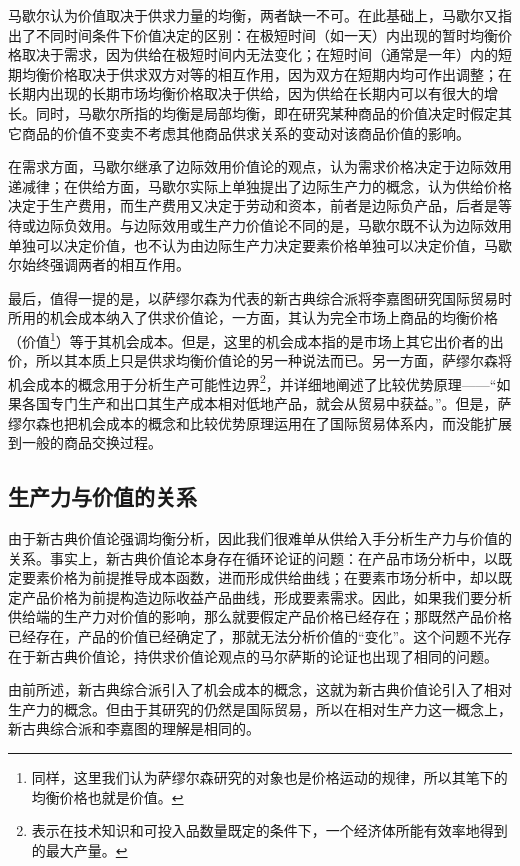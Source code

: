 马歇尔认为价值取决于供求力量的均衡，两者缺一不可。在此基础上，马歇尔又指出了不同时间条件下价值决定的区别：在极短时间（如一天）内出现的暂时均衡价格取决于需求，因为供给在极短时间内无法变化；在短时间（通常是一年）内的短期均衡价格取决于供求双方对等的相互作用，因为双方在短期内均可作出调整；在长期内出现的长期市场均衡价格取决于供给，因为供给在长期内可以有很大的增长\cite[299-300]{YanZhiJieXiFangJingJiXueShuoShiJiaoChengDiErBan2013}\cite[390]{YanZhiJieCongBianJiGeMingDaoKaiEnSiGeMing2022}。同时，马歇尔所指的均衡是局部均衡，即在研究某种商品的价值决定时假定其它商品的价值不变卖不考虑其他商品供求关系的变动对该商品价值的影响\cite[391]{YanZhiJieCongBianJiGeMingDaoKaiEnSiGeMing2022}。

 在需求方面，马歇尔继承了边际效用价值论的观点，认为需求价格决定于边际效用递减律；在供给方面，马歇尔实际上单独提出了边际生产力的概念\cite[8223]{macmillanpublishersltdNewPalgraveDictionary2018}，认为供给价格决定于生产费用，而生产费用又决定于劳动和资本，前者是边际负产品，后者是等待或边际负效用\cite[391]{YanZhiJieCongBianJiGeMingDaoKaiEnSiGeMing2022}。与边际效用或生产力价值论不同的是，马歇尔既不认为边际效用单独可以决定价值，也不认为由边际生产力决定要素价格单独可以决定价值，马歇尔始终强调两者的相互作用。

最后，值得一提的是，以萨缪尔森为代表的新古典综合派将李嘉图研究国际贸易时所用的机会成本纳入了供求价值论，一方面，其认为完全市场上商品的均衡价格（价值\footnote{同样，这里我们认为萨缪尔森研究的对象也是价格运动的规律，所以其笔下的均衡价格也就是价值。}）等于其机会成本\cite[228]{BaoLuo*SaMouErSenJingJiXueDiShiJiuBan2012}。但是，这里的机会成本指的是市场上其它出价者的出价\cite[228-229]{BaoLuo*SaMouErSenJingJiXueDiShiJiuBan2012}，所以其本质上只是供求均衡价值论的另一种说法而已。另一方面，萨缪尔森将机会成本的概念用于分析生产可能性边界\footnote{表示在技术知识和可投入品数量既定的条件下，一个经济体所能有效率地得到的最大产量\cite[22]{BaoLuo*SaMouErSenJingJiXueDiShiJiuBan2012}。}，并详细地阐述了比较优势原理——“如果各国专门生产和出口其生产成本相对低地产品，就会从贸易中获益。”\cite[581]{BaoLuo*SaMouErSenJingJiXueDiShiJiuBan2012}。但是，萨缪尔森也把机会成本的概念和比较优势原理运用在了国际贸易体系内，而没能扩展到一般的商品交换过程。

 \subsection{生产力与价值的关系}

 由于新古典价值论强调均衡分析，因此我们很难单从供给入手分析生产力与价值的关系。事实上，新古典价值论本身存在循环论证的问题：在产品市场分析中，以既定要素价格为前提推导成本函数，进而形成供给曲线；在要素市场分析中，却以既定产品价格为前提构造边际收益产品曲线，形成要素需求\cite[186]{CaiJiMingCongGuDianZhengZhiJingJiXueDaoZhongGuoTeSeSheHuiZhuYiZhengZhiJingJiXueJiYuZhongGuoShiJiaoDeZhengZhiJingJiXueYanBianShangCe2023}。因此，如果我们要分析供给端的生产力对价值的影响，那么就要假定产品价格已经存在；那既然产品价格已经存在，产品的价值已经确定了，那就无法分析价值的“变化”。这个问题不光存在于新古典价值论，持供求价值论观点的马尔萨斯的论证也出现了相同的问题。

由前所述，新古典综合派引入了机会成本的概念，这就为新古典价值论引入了相对生产力的概念。但由于其研究的仍然是国际贸易，所以在相对生产力这一概念上，新古典综合派和李嘉图的理解是相同的。